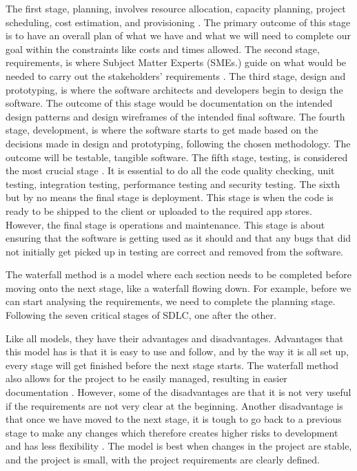 	The first stage, planning, involves resource allocation, capacity planning, project scheduling, cost estimation, and provisioning \cite{SDLC}. The primary outcome of this stage is to have an overall plan of what we have and what we will need to complete our goal within the constraints like costs and times allowed. The second stage, requirements, is where Subject Matter Experts (SMEs.) guide on what would be needed to carry out the stakeholders' requirements \cite{SDLC}. The third stage, design and prototyping, is where the software architects and developers begin to design the software. The outcome of this stage would be documentation on the intended design patterns and design wireframes of the intended final software. The fourth stage, development, is where the software starts to get made based on the decisions made in design and prototyping, following the chosen methodology. The outcome will be testable, tangible software. The fifth stage, testing, is considered the most crucial stage \cite{SDLC}. It is essential to do all the code quality checking, unit testing, integration testing, performance testing and security testing. The sixth but by no means the final stage is deployment. This stage is when the code is ready to be shipped to the client or uploaded to the required app stores. However, the final stage is operations and maintenance. This stage is about ensuring that the software is getting used as it should and that any bugs that did not initially get picked up in testing are correct and removed from the software. 
	
	The waterfall method is a model where each section needs to be completed before moving onto the next stage, like a waterfall flowing down. For example, before we can start analysing the requirements, we need to complete the planning stage. Following the seven critical stages of SDLC, one after the other.
	
	Like all models, they have their advantages and disadvantages. Advantages that this model has is that it is easy to use and follow, and by the way it is all set up, every stage will get finished before the next stage starts. The waterfall method also allows for the project to be easily managed, resulting in easier documentation \cite{cscm01slidesl5}. However, some of the disadvantages are that it is not very useful if the requirements are not very clear at the beginning. Another disadvantage is that once we have moved to the next stage, it is tough to go back to a previous stage to make any changes which therefore creates higher risks to development and has less flexibility \cite{cscm01slidesl5}. The model is best when changes in the project are stable, and the project is small, with the project requirements are clearly defined.
	
